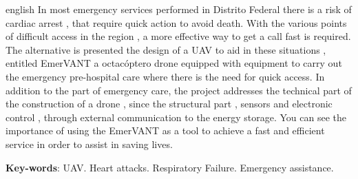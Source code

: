 \begin{resumo}[Abstract]
 \begin{otherlanguage*}{english}
  In most emergency services performed in Distrito Federal there is a risk of cardiac arrest ,
that require quick action to avoid death. With the various points of difficult access in the region , a more effective way to get a call
fast is required. The alternative is presented the design of a UAV to aid in these situations , entitled EmerVANT a octacóptero drone
equipped with equipment to carry out the emergency pre-hospital care where there is the need for quick access. In addition to the part of emergency care,
the project addresses the technical part of the construction of a drone , since the structural part , sensors and electronic control , through external communication to the
energy storage. You can see the importance of using the EmerVANT as a tool to achieve a fast and efficient service in order to
assist in saving lives.

   \vspace{\onelineskip}
 
   \noindent 
   \textbf{Key-words}: UAV. Heart attacks. Respiratory Failure. Emergency assistance.
 \end{otherlanguage*}
\end{resumo}
